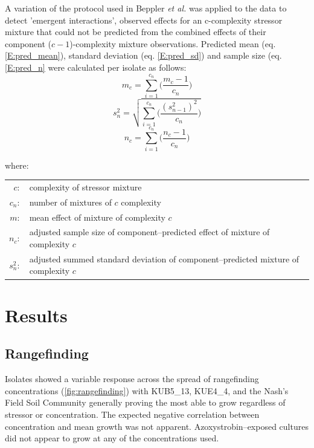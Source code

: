 \documentclass[final,1p,times]{elsarticle}
\begin{document}
A variation of the protocol used in Beppler \textit{et al.} \cite{Beppler2016} was applied to the data to detect 'emergent interactions', observed effects for an c-complexity stressor mixture that could not be predicted from the combined effects of their component ($c-1$)-complexity mixture observations. Predicted mean (eq. \ref{E:pred_mean}), standard deviation (eq. \ref{E:pred_sd}) and sample size (eq. \ref{E:pred_n} were calculated per isolate as follows: 
\begin{equation}[ht]
    m_c = \sum_{i = 1}^{c_n}\Big(\frac{m_c-1}{c_n}\Big)
\label{E:pred_mean}    
\end{equation}
\begin{equation}
    s^2_n = \sqrt{\sum_{i = 1}^{c_n}\bigg(\frac{(s^2_{n-1})^2}{c_n}\bigg)}
\label{E:pred_sd}    
\end{equation}
\begin{equation}
    n_c = \sum_{i = 1}^{c_n}\Big(\frac{n_c-1}{c_n}\Big)
\label{E:pred_n}    
\end{equation}

\mbox{where:}

\begin{small}
\setlength{\tabcolsep}{1pt}
\begin{tabular}{r p{11cm}}
    $c :$ & complexity of stressor mixture \\
    $c_n :$ & number of mixtures of $c$ complexity \\
    $m :$ & mean effect of mixture of complexity $c$ \\
    $n_c :$ & adjusted sample size of component--predicted effect of mixture of complexity $c$ \\
    $s^2_n :$ & adjusted summed standard deviation of component--predicted mixture of complexity $c$ \\
\end{tabular}
\end{small}

\section{Results}
\label{S:3}

\subsection{Rangefinding}
\label{S:3:1}

Isolates showed a variable response across the spread of rangefinding concentrations (\cref{fig:rangefinding}) with KUB5\_13, KUE4\_4, and the Nash's Field Soil Community generally proving the most able to grow regardless of stressor or concentration. The expected negative correlation between concentration and mean growth was not apparent. Azoxystrobin--exposed cultures did not appear to grow at any of the concentrations used.
\end{document}
